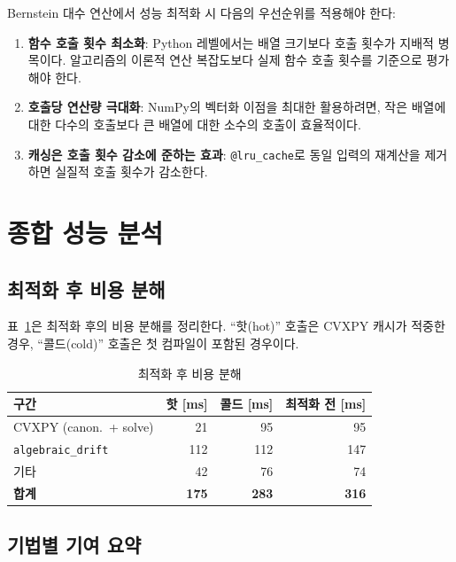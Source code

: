 \documentclass[11pt]{article}
\begin{document}
Bernstein 대수 연산에서 성능 최적화 시
다음의 우선순위를 적용해야 한다:

\begin{enumerate}
  \item \textbf{함수 호출 횟수 최소화}:
    Python 레벨에서는 배열 크기보다 호출 횟수가 지배적 병목이다.
    알고리즘의 이론적 연산 복잡도보다
    실제 함수 호출 횟수를 기준으로 평가해야 한다.
  \item \textbf{호출당 연산량 극대화}:
    NumPy의 벡터화 이점을 최대한 활용하려면,
    작은 배열에 대한 다수의 호출보다
    큰 배열에 대한 소수의 호출이 효율적이다.
  \item \textbf{캐싱은 호출 횟수 감소에 준하는 효과}:
    \texttt{@lru\_cache}로 동일 입력의 재계산을 제거하면
    실질적 호출 횟수가 감소한다.
\end{enumerate}


\section{종합 성능 분석}
\label{sec:results}

\subsection{최적화 후 비용 분해}

표~\ref{tab:after}은 최적화 후의 비용 분해를 정리한다.
``핫(hot)'' 호출은 CVXPY 캐시가 적중한 경우,
``콜드(cold)'' 호출은 첫 컴파일이 포함된 경우이다.

\begin{table}[h]
\centering
\caption{최적화 후 비용 분해}
\label{tab:after}
\begin{tabular}{lrrr}
\toprule
구간 & 핫 [ms] & 콜드 [ms] & 최적화 전 [ms] \\
\midrule
CVXPY (canon.\ + solve) & 21 & 95 & 95 \\
\texttt{algebraic\_drift} & 112 & 112 & 147 \\
기타 & 42 & 76 & 74 \\
\midrule
\textbf{합계} & \textbf{175} & \textbf{283} & \textbf{316} \\
\bottomrule
\end{tabular}
\end{table}

\subsection{기법별 기여 요약}
\end{document}
